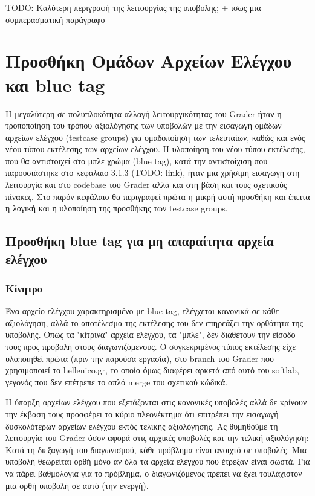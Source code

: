 \documentclass[diploma]{softlab-thesis}
\begin{document}
TODO: Καλύτερη περιγραφή της λειτουργίας της υποβολης; + ισως μια συμπερασματική παράγραφο

\chapter{Προσθήκη Ομάδων Αρχείων Ελέγχου και blue tag}

Η μεγαλύτερη σε πολυπλοκότητα αλλαγή λειτουργικότητας του Grader ήταν η
τροποποίηση του τρόπου αξιολόγησης των υποβολών με την εισαγωγή ομάδων αρχείων
ελέγχου (testcase groups) για ομαδοποίηση των τελευταίων, καθώς και ενός νέου
τύπου εκτέλεσης των αρχείων ελέγχου. Η υλοποίηση του νέου τύπου εκτέλεσης, που
θα αντιστοιχεί στο μπλε χρώμα (blue tag), κατά την αντιστοίχιση που
παρουσιάστηκε στο κεφάλαιο 3.1.3 (TODO: link), ήταν μια χρήσιμη εισαγωγή στη
λειτουργία και στο codebase του Grader αλλά και στη βάση και τους σχετικούς
πίνακες. Στο παρόν κεφάλαιο θα περιγραφεί πρώτα η μικρή αυτή προσθήκη και
έπειτα η λογική και η υλοποίηση της προσθήκης των testcase groups.


\section{Προσθήκη blue tag για μη απαραίτητα αρχεία ελέγχου}

\subsection{Κίνητρο}

Ένα αρχείο ελέγχου χαρακτηρισμένο με blue tag, ελέγχεται κανονικά σε κάθε
αξιολόγηση, αλλά το αποτέλεσμα της εκτέλεσης του δεν επηρεάζει την ορθότητα της
υποβολής. Όπως τα "κίτρινα" αρχεία ελέγχου, τα "μπλε", δεν διαθέτουν την είσοδο
τους προς προβολή στους διαγωνιζόμενους. Ο συγκεκριμένος τύπος εκτέλεσης είχε
υλοποιηθεί πρώτα (πριν την παρούσα εργασία), στο branch του Grader που
χρησιμοποιεί το hellenico.gr, το οποίο όμως διαφέρει αρκετά από αυτό του softlab,
γεγονός που δεν επέτρεπε το απλό merge του σχετικού κώδικά.


\bigskip

Η ύπαρξη αρχείων ελέγχου που εξετάζονται στις κανονικές υποβολές αλλά δε
κρίνουν την έκβαση τους προσφέρει το κύριο πλεονέκτημα ότι επιτρέπει την
εισαγωγή δυσκολότερων αρχείων ελέγχου εκτός τελικής αξιολόγησης. Ας θυμηθούμε
τη λειτουργία του Grader όσον αφορά στις αρχικές υποβολές και την τελική
αξιολόγηση: Κατά τη διεξαγωγή του διαγωνισμού, κάθε πρόβλημα είναι ανοιχτό σε
υποβολές. Μια υποβολή θεωρείται ορθή μόνο αν όλα τα αρχεία ελέγχου που έτρεξαν
είναι σωστά. Για να πάρει βαθμολογία για το πρόβλημα, ο διαγωνιζόμενος πρέπει
να έχει τουλάχιστον μια ορθή υποβολή σε αυτό (την ενεργή).
\end{document}
